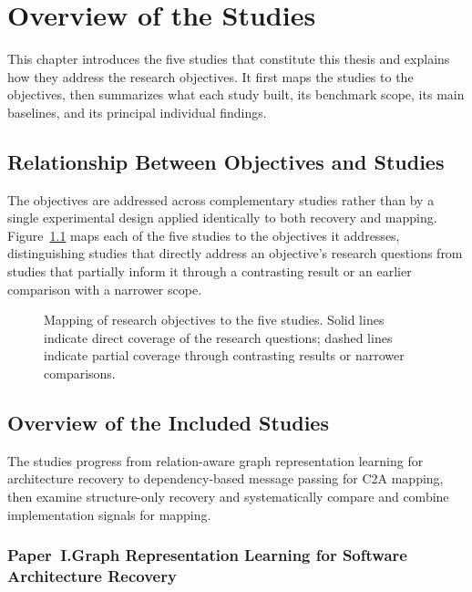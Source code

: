 \chapter{Overview of the Studies}
\label{ch:studies}
\chaptertoc

This chapter introduces the five studies that constitute this thesis and explains how they address the research objectives. It first maps the studies to the objectives, then summarizes what each study built, its benchmark scope, its main baselines, and its principal individual findings.

\section{Relationship Between Objectives and Studies}
\label{sec:objectives-studies}

The objectives are addressed across complementary studies rather than by a single experimental design applied identically to both recovery and mapping. Figure~\ref{fig:objective_map} maps each of the five studies to the objectives it addresses, distinguishing studies that directly address an objective's research questions from studies that partially inform it through a contrasting result or an earlier comparison with a narrower scope.

\begin{figure}[t]
    \centering
    \resizebox{1\textwidth}{!}{}
    \caption[A high-level overview of objectives mapped to the papers.]{Mapping of research objectives to the five studies. Solid lines indicate direct coverage of the research questions; dashed lines indicate partial coverage through contrasting results or narrower comparisons.\label{fig:objective_map}}
\end{figure}

\section{Overview of the Included Studies \label{sec:studies-overview}}
The studies progress from relation-aware graph representation learning for architecture recovery to dependency-based message passing for C2A mapping, then examine structure-only recovery and systematically compare and combine implementation signals for mapping.

\subsection[Paper~I: Software Architecture Recovery]{Paper~I.\quad Graph Representation Learning for Software Architecture Recovery}
\label{sec:overview-arl}

